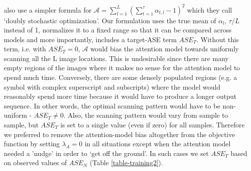 \citealt{Xu2015ShowAA} also use a simpler formula for $\mathcal{A} = \sum_{l=1}^{L} \left( \sum_{t=1}^{\tau}\alpha_{t,l} -1 \right)^2$ which they call `doubly stochastic optimization'. Our formulation uses the true mean of $\alpha_l$, $\tau / L$ instead of 1, normalizes it to a fixed range so that it can be compared across models and more importantly, includes a target-ASE term $ASE_T$. Without this term, i.e. with $ASE_T=0$, $\mathcal{A}$ would bias the attention model towards uniformly scanning all the L image locations. This is undesirable since there are many empty regions of the images where it makes no sense for the attention model to spend much time. Conversely, there are some densely populated regions (e.g. a symbol with complex superscript and subscripts) where the model would reasonably spend more time because it would have to produce a longer output sequence. In other words, the optimal scanning pattern would have to be non-uniform - $ASE_T \neq 0$. Also, the scanning pattern would vary from sample to sample, but $ASE_T$ is set to a single value (even if zero) for all samples. Therefore we preferred to remove the attention-model bias altogether from the objective function by setting $\lambda_A=0$ in all situations except when the attention model needed a 'nudge' in order to `get off the ground'. In such cases we set $ASE_T$ based on observed values of $ASE_N$ (Table \ref{table-training2}).



